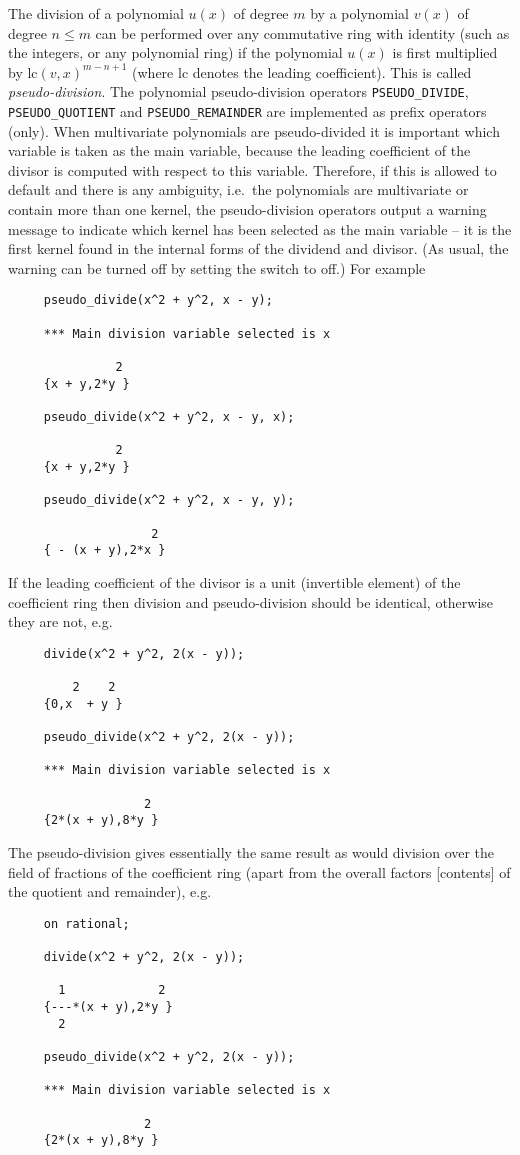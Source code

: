 The division of a polynomial $u(x)$ of degree $m$ by a polynomial
$v(x)$ of degree $n \le m$ can be performed over any commutative ring
with identity (such as the integers, or any polynomial ring) if the
polynomial $u(x)$ is first multiplied by $\mathrm{lc}(v,x)^{m-n+1}$
(where lc denotes the leading coefficient).  This is called
\emph{pseudo-division}.  The polynomial pseudo-division operators
\texttt{PSEUDO\_DIVIDE}, \texttt{PSEUDO\_QUOTIENT} and
\texttt{PSEUDO\_REMAINDER} are implemented as prefix operators (only).
When multivariate polynomials are pseudo-divided it is important which
variable is taken as the main variable, because the leading
coefficient of the divisor is computed with respect to this variable.
Therefore, if this is allowed to default and there is any ambiguity,
i.e.\ the polynomials are multivariate or contain more than one
kernel, the pseudo-division operators output a warning message to
indicate which kernel has been selected as the main variable -- it is
the first kernel found in the internal forms of the dividend and
divisor.  (As usual, the warning can be turned off by setting the
switch  to off.)  For example
\begin{verbatim}
     pseudo_divide(x^2 + y^2, x - y);

     *** Main division variable selected is x 

               2
     {x + y,2*y }

     pseudo_divide(x^2 + y^2, x - y, x);

               2
     {x + y,2*y }

     pseudo_divide(x^2 + y^2, x - y, y);

                    2
     { - (x + y),2*x }
\end{verbatim}

If the leading coefficient of the divisor is a unit (invertible
element) of the coefficient ring then division and pseudo-division
should be identical, otherwise they are not, e.g.
\begin{verbatim}
     divide(x^2 + y^2, 2(x - y));

         2    2
     {0,x  + y }

     pseudo_divide(x^2 + y^2, 2(x - y));

     *** Main division variable selected is x

                   2
     {2*(x + y),8*y }
\end{verbatim}

The pseudo-division gives essentially the same result as would
division over the field of fractions of the coefficient ring (apart
from the overall factors [contents] of the quotient and remainder),
e.g.
\begin{verbatim}
     on rational;

     divide(x^2 + y^2, 2(x - y));

       1             2
     {---*(x + y),2*y }
       2

     pseudo_divide(x^2 + y^2, 2(x - y));

     *** Main division variable selected is x

                   2
     {2*(x + y),8*y }
\end{verbatim}

